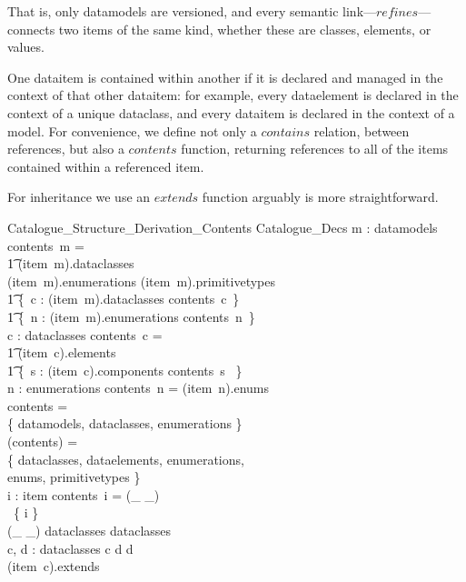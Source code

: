 \documentclass[a4paper,twoside]{article}
\def\refines{\mathrel{refines}}
\def\extends{\mathrel{extends}}
\def\contains{\mathrel{contains}}
\begin{document}
That is, only datamodels are versioned, and every semantic link---$\refines$---connects two items of the same kind, whether these are classes, elements, or values.

One dataitem is contained within another if it is declared and managed in the context of that other dataitem: for example, every dataelement is declared in the context of a unique dataclass, and every dataitem is declared in the context of a model.  For convenience, we define not only a $contains$ relation, between references, but also a $contents$ function, returning references to all of the items contained within a referenced item.

For inheritance we use an $extends$ function arguably is more straightforward. 

\begin{schema}{Catalogue\_Structure\_Derivation\_Contents}
	Catalogue\_Decs
	\where
	\forall m : datamodels \spot contents~m = {} \\
	\t1 (item~m).dataclasses \cup\\ (item~m).enumerations \cup
	(item~m).primitivetypes \cup {} \\
	\t1 \bigcup \{~c : (item~m).dataclasses \spot contents~c~\} \cup {} \\
	\t1 \bigcup \{~n : (item~m).enumerations \spot contents~n~\}
	\\
	\forall c : dataclasses \spot contents~c = {} \\
	\t1 (item~c).elements  \cup {} \\
	\t1 \bigcup \{~s : (item~c).components \spot contents~s ~\}
	\\
	\forall n : enumerations \spot contents~n = (item~n).enums
	\\
	\dom contents =\\ \bigcup \{ datamodels, dataclasses, enumerations \} 
	\\
	\bigcup (\ran contents) =\\ \bigcup \{ dataclasses, dataelements, enumerations,\\ enums,
	primitivetypes \} 
	\\
	\forall i : \dom item \spot contents~i = (\_ \contains \_)\\ ~\limg \{ i \}
	\rimg \\
	(\_ \extends \_) \in dataclasses \rel dataclasses \\
	\forall c, d : dataclasses \spot c \extends d \iff 
	d \in \\(item~c).extends
\end{schema}
\end{document}

